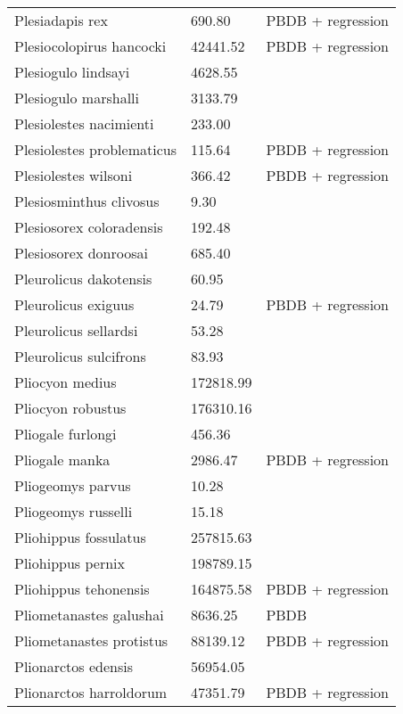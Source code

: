 \documentclass{article}
\begin{document}
\begin{center}
\begin{longtable}{p{} p{} p{}}
    Plesiadapis rex & 690.80 & PBDB + regression \\ 
    Plesiocolopirus hancocki & 42441.52 & PBDB + regression \\ 
    Plesiogulo lindsayi & 4628.55 & \cite{Tomiya2013} \\ 
    Plesiogulo marshalli & 3133.79 & \cite{Tomiya2013} \\ 
    Plesiolestes nacimienti & 233.00 & \cite{Soligo2006} \\ 
    Plesiolestes problematicus & 115.64 & PBDB + regression \\ 
    Plesiolestes wilsoni & 366.42 & PBDB + regression \\ 
    Plesiosminthus clivosus & 9.30 & \cite{Tomiya2013} \\ 
    Plesiosorex coloradensis & 192.48 & \cite{Tomiya2013} \\ 
    Plesiosorex donroosai & 685.40 & \cite{Tomiya2013} \\ 
    Pleurolicus dakotensis & 60.95 & \cite{Tomiya2013} \\ 
    Pleurolicus exiguus & 24.79 & PBDB + regression \\ 
    Pleurolicus sellardsi & 53.28 & \cite{Zakrzewski1991a} \\ 
    Pleurolicus sulcifrons & 83.93 & \cite{Tomiya2013} \\ 
    Pliocyon medius & 172818.99 & \cite{Tomiya2013} \\ 
    Pliocyon robustus & 176310.16 & \cite{Tomiya2013} \\ 
    Pliogale furlongi & 456.36 & \cite{Wood1962} \\ 
    Pliogale manka & 2986.47 & PBDB + regression \\ 
    Pliogeomys parvus & 10.28 & \cite{Tomiya2013} \\ 
    Pliogeomys russelli & 15.18 & \cite{Tomiya2013} \\ 
    Pliohippus fossulatus & 257815.63 & \cite{Tomiya2013} \\ 
    Pliohippus pernix & 198789.15 & \cite{Tomiya2013} \\ 
    Pliohippus tehonensis & 164875.58 & PBDB + regression \\ 
    Pliometanastes galushai & 8636.25 & PBDB \\ 
    Pliometanastes protistus & 88139.12 & PBDB + regression \\ 
    Plionarctos edensis & 56954.05 & \cite{Tomiya2013} \\ 
    Plionarctos harroldorum & 47351.79 & PBDB + regression \\ 

\end{longtable}
\end{center}
\end{document}
